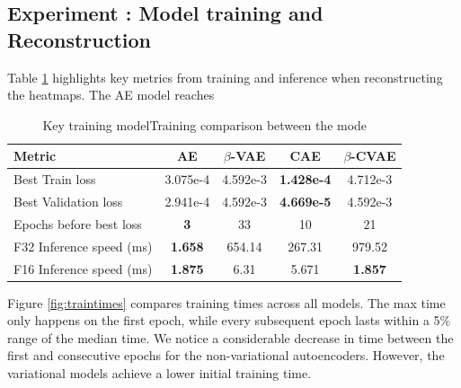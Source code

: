 \subsection{Experiment : Model training and Reconstruction}

Table \ref{tab:modelresinfo} highlights key metrics from training and inference when reconstructing the heatmaps. The AE model reaches 
\begin{table}[!htbp]
    \centering
    \setlength{\tabcolsep}{10pt}
    \begin{tabular}{l cccc}
        \toprule
        \rowcolor{gray!20}
        \textbf{Metric} & AE & $\beta$-VAE & CAE & $\beta$-CVAE \\
        \midrule
        Best Train loss & 3.075e-4 & 4.592e-3 & \textbf{1.428e-4} & 4.712e-3 \\
        \rowcolor{gray!10} Best Validation loss & 2.941e-4 & 4.592e-3 & \textbf{4.669e-5} & 4.592e-3 \\
        Epochs before best loss & \textbf{3} & 33 & 10 & 21 \\
        F32 Inference speed (ms) & \textbf{1.658} & 654.14 & 267.31 & 979.52 \\
        \rowcolor{gray!10} F16 Inference speed (ms) & \textbf{1.875} & 6.31 & 5.671 & \textbf{1.857} \\
        \bottomrule
    \end{tabular}
    \caption{Key training modelTraining comparison between the mode}
    \label{tab:modelresinfo}
    \smallskip
\end{table}

Figure \ref{fig:traintimes} compares training times across all models. The max time only happens on the first epoch, while every subsequent epoch lasts within a 5\% range of the median time. We notice a considerable decrease in time between the first and consecutive epochs for the non-variational autoencoders. However, the variational models achieve a lower initial training time. 

